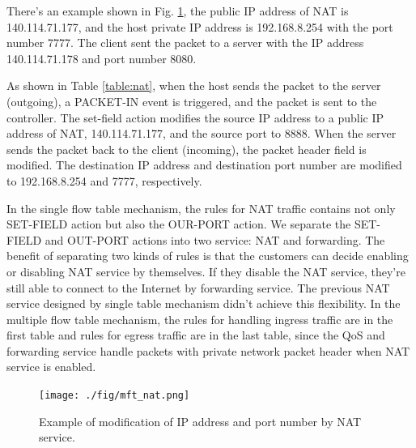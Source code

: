 There’s an example shown in Fig. \ref{fig:mft_nat}, the public IP address of NAT is 140.114.71.177, and the host private IP address is 192.168.8.254 with the port number 7777. The client sent the packet to a server with the IP address 140.114.71.178 and port number 8080.

As shown in Table \ref{table:nat}, when the host sends the packet to the server (outgoing), a PACKET-IN event is triggered, and the packet is sent to the controller. The set-field action modifies the source IP address to a public IP address of NAT, 140.114.71.177, and the source port to 8888. When the server sends the packet back to the client (incoming), the packet header field is modified. The destination IP address and destination port number are modified to 192.168.8.254 and 7777, respectively.

In the single flow table mechanism, the rules for NAT traffic contains not only SET-FIELD action but also the OUR-PORT action.
We separate the SET-FIELD and OUT-PORT actions into two service: NAT and forwarding.
The benefit of separating two kinds of rules is that the customers can decide enabling or disabling NAT service by themselves.
If they disable the NAT service, they’re still able to connect to the Internet by forwarding service.
The previous NAT service designed by single table mechanism didn’t achieve this flexibility.
In the multiple flow table mechanism, the rules for handling ingress traffic are in the first table and rules for egress traffic are in the last table, since the QoS and forwarding service handle packets with private network packet header when NAT service is enabled.


\begin{figure}[!t]
\centering
\texttt{[image: ./fig/mft\_nat.png]}
\caption{Example of modification of IP address and port number by NAT service.}
\label{fig:mft_nat}
\end{figure}

